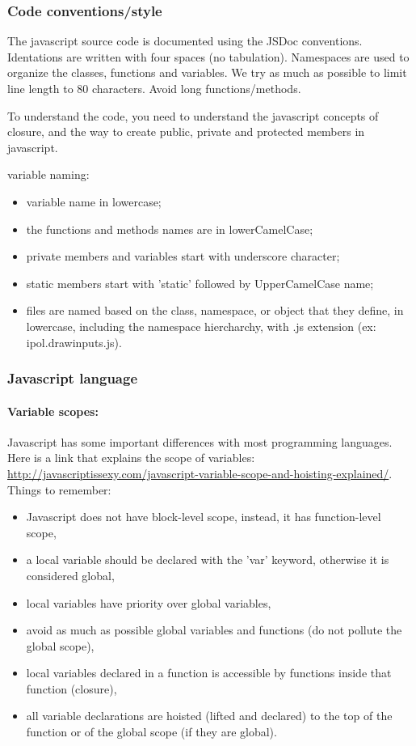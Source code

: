 \subsubsection{Code conventions/style}

The javascript source code is documented using the JSDoc conventions.
Identations are written with four spaces (no tabulation).
Namespaces are used to organize the classes, functions and variables.
We try as much as possible to limit line length to 80 characters.
Avoid long functions/methods.

To understand the code, you need to understand the javascript concepts of closure,
and the way to create public, private and protected members in javascript.

variable naming:
\begin{itemize}
  \item variable name in lowercase;
  \item the functions and methods names are in lowerCamelCase;
  \item private members and variables start with underscore character;
  \item static members start with 'static' followed by UpperCamelCase name;
  \item files are named based on the class, namespace, or object that they define,
        in lowercase, including the namespace hiercharchy, 
        with .js extension (ex: ipol.drawinputs.js).
\end{itemize}

\subsubsection{Javascript language}

\paragraph{Variable scopes:}
Javascript has some important differences with most programming languages.
Here is a link that explains the scope of variables: 
\url{http://javascriptissexy.com/javascript-variable-scope-and-hoisting-explained/}.
Things to remember:
\begin{itemize}
 \item Javascript does not have block-level scope, instead, it has function-level scope,
 \item a local variable should be declared with the 'var' keyword, otherwise it is considered global,
 \item local variables have priority over global variables,
 \item avoid as much as possible global variables and functions (do not pollute the global scope),
 \item local variables declared in a function is accessible by functions inside that function (closure),
 \item all variable declarations are hoisted (lifted and declared) to the top of the function or of the
       global scope (if they are global).
\end{itemize}

